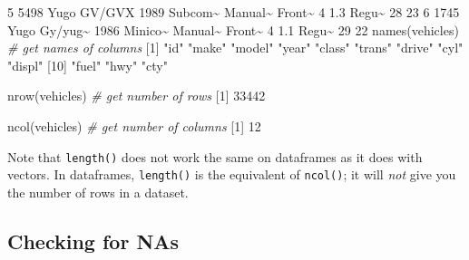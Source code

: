 \documentclass[
]{book}
\newenvironment{Shaded}{\begin{snugshade}}{\end{snugshade}}
\newcommand{\CommentTok}[1]{\textcolor[rgb]{0.56,0.35,0.01}{\textit{#1}}}
\newcommand{\DecValTok}[1]{\textcolor[rgb]{0.00,0.00,0.81}{#1}}
\newcommand{\FloatTok}[1]{\textcolor[rgb]{0.00,0.00,0.81}{#1}}
\newcommand{\FunctionTok}[1]{\textcolor[rgb]{0.00,0.00,0.00}{#1}}
\newcommand{\NormalTok}[1]{#1}
\newcommand{\SpecialCharTok}[1]{\textcolor[rgb]{0.00,0.00,0.00}{#1}}
\newcommand{\StringTok}[1]{\textcolor[rgb]{0.31,0.60,0.02}{#1}}
\begin{document}
\begin{Shaded}
\begin{Highlighting}[]
\DecValTok{5}  \DecValTok{5498}\NormalTok{ Yugo  GV}\SpecialCharTok{/}\NormalTok{GVX   }\DecValTok{1989}\NormalTok{ Subcom}\SpecialCharTok{\textasciitilde{}}\NormalTok{ Manual}\SpecialCharTok{\textasciitilde{}}\NormalTok{ Front}\SpecialCharTok{\textasciitilde{}}     \DecValTok{4}   \FloatTok{1.3}\NormalTok{ Regu}\SpecialCharTok{\textasciitilde{}}    \DecValTok{28}    \DecValTok{23}
\DecValTok{6}  \DecValTok{1745}\NormalTok{ Yugo  Gy}\SpecialCharTok{/}\NormalTok{yug}\SpecialCharTok{\textasciitilde{}}  \DecValTok{1986}\NormalTok{ Minico}\SpecialCharTok{\textasciitilde{}}\NormalTok{ Manual}\SpecialCharTok{\textasciitilde{}}\NormalTok{ Front}\SpecialCharTok{\textasciitilde{}}     \DecValTok{4}   \FloatTok{1.1}\NormalTok{ Regu}\SpecialCharTok{\textasciitilde{}}    \DecValTok{29}    \DecValTok{22}
\FunctionTok{names}\NormalTok{(vehicles) }\CommentTok{\# get names of columns}
\NormalTok{ [}\DecValTok{1}\NormalTok{] }\StringTok{"id"}    \StringTok{"make"}  \StringTok{"model"} \StringTok{"year"}  \StringTok{"class"} \StringTok{"trans"} \StringTok{"drive"} \StringTok{"cyl"}   \StringTok{"displ"}
\NormalTok{[}\DecValTok{10}\NormalTok{] }\StringTok{"fuel"}  \StringTok{"hwy"}   \StringTok{"cty"}  

\FunctionTok{nrow}\NormalTok{(vehicles) }\CommentTok{\# get number of rows}
\NormalTok{[}\DecValTok{1}\NormalTok{] }\DecValTok{33442}

\FunctionTok{ncol}\NormalTok{(vehicles) }\CommentTok{\# get number of columns}
\NormalTok{[}\DecValTok{1}\NormalTok{] }\DecValTok{12}
\end{Highlighting}
\end{Shaded}

Note that \texttt{length()} does not work the same on dataframes as it does with vectors. In dataframes, \texttt{length()} is the equivalent of \texttt{ncol()}; it will \emph{not} give you the number of rows in a dataset.

\hypertarget{checking-for-nas}{%
\subsection*{Checking for NAs}\label{checking-for-nas}}

\begin{Shaded}
\end{Shaded}
\end{document}
